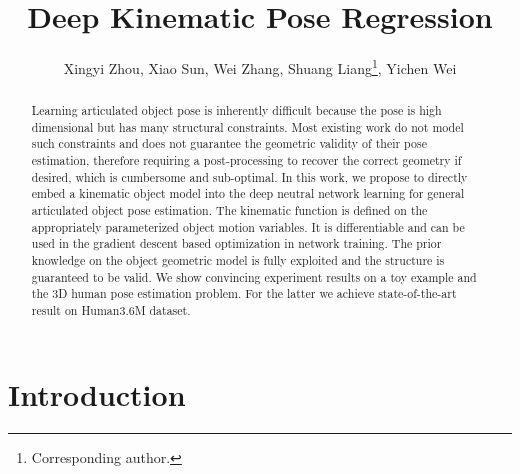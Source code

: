 \documentclass[runningheads]{llncs}
\begin{document}
\pagestyle{headings}
\mainmatter

\title{Deep Kinematic Pose Regression} 



\author{Xingyi Zhou, Xiao Sun, Wei Zhang,  Shuang Liang\thanks{Corresponding author.}, Yichen Wei}




\maketitle

\begin{abstract}
Learning articulated object pose is inherently difficult because the pose is high dimensional but has many structural constraints. Most existing work do not model such constraints and does not guarantee the geometric validity of their pose estimation, therefore requiring a post-processing to recover the correct geometry if desired, which is cumbersome and sub-optimal. In this work, we propose to directly embed a kinematic object model into the deep neutral network learning for general articulated object pose estimation. The kinematic function is defined on the appropriately parameterized object motion variables. It is differentiable and can be used in the gradient descent based optimization in network training. The prior knowledge on the object geometric model is fully exploited and the structure is guaranteed to be valid. We show convincing experiment results on a toy example and the 3D human pose estimation problem. For the latter we achieve state-of-the-art result on Human3.6M dataset.
\end{abstract}


\section{Introduction}
\end{document}
